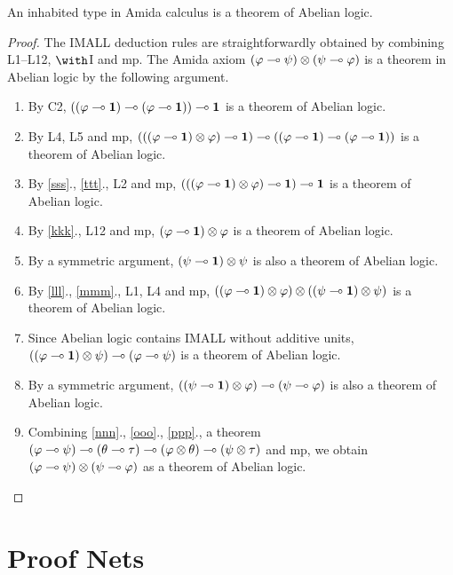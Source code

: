 \begin{theorem}
 \label{sound-to-abelian}
 An inhabited type in Amida calculus is a theorem of Abelian logic.
\end{theorem}
\begin{proof}
 The IMALL deduction rules are straightforwardly obtained by combining
 L1--L12, $\with$I and mp.
 The Amida axiom $(\varphi\multimap\psi)\otimes (\psi\multimap\varphi)$ is a theorem
 in Abelian logic by the following argument.
 \begin{enumerate}
  \item \label{sss} By C2, $((\varphi\multimap\mathbf{1})\multimap(\varphi\multimap\mathbf{1}))\multimap\mathbf{1}$ is a
	theorem of Abelian logic.
  \item \label{ttt} By L4, L5 and mp,
	$(((\varphi\multimap\mathbf{1})\otimes\varphi)\multimap\mathbf{1}) \multimap
	((\varphi\multimap\mathbf{1})\multimap(\varphi\multimap\mathbf{1}))$ is a theorem of Abelian
	logic.
  \item \label{kkk} By \ref{sss}., \ref{ttt}., L2 and mp,
	$ (((\varphi\multimap\mathbf{1})\otimes\varphi)\multimap\mathbf{1}) \multimap \mathbf{1} $ is a
	theorem of Abelian logic.
  \item \label{lll} By \ref{kkk}., L12 and mp,
	$(\varphi\multimap \mathbf{1})\otimes\varphi$ is a theorem of Abelian logic.
  \item \label{mmm} By a symmetric argument, $(\psi\multimap\mathbf{1})\otimes\psi$ is also a
	theorem of Abelian logic.
  \item \label{nnn} By \ref{lll}., \ref{mmm}., L1, L4 and mp, $((\varphi\multimap
	\mathbf{1})\otimes\varphi)\otimes((\psi\multimap\mathbf{1})\otimes\psi)$ is a
	theorem of Abelian logic.
  \item \label{ooo} Since Abelian logic contains IMALL without additive units,
	$((\varphi\multimap\mathbf{1})\otimes\psi)\multimap(\varphi\multimap\psi)$ is a theorem
	of Abelian logic.
  \item \label{ppp} By a symmetric argument,
	$((\psi\multimap\mathbf{1})\otimes\varphi)\multimap(\psi\multimap\varphi)$ is also a
	theorem of Abelian logic.
  \item Combining \ref{nnn}., \ref{ooo}., \ref{ppp}., a theorem
	$(\varphi\multimap\psi)\multimap(\theta\multimap\tau)\multimap(\varphi\otimes\theta)\multimap(\psi\otimes\tau)$
	and
	mp, we obtain $(\varphi\multimap\psi)\otimes(\psi\multimap\varphi)$ as a
	theorem of Abelian
	logic.
 \end{enumerate}
\end{proof}


\section{Proof Nets}
\label{sec:proofnets}

